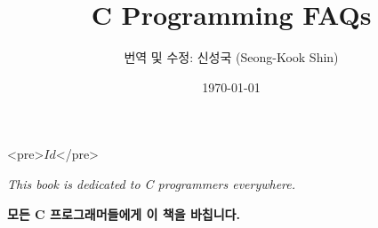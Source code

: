 \documentclass[10pt,a4paper,draft]{report}
\title{C Programming FAQs}
\author{번역 및 수정: 신성국 (Seong-Kook Shin)}
\date{\today}
\newcommand{\BF}[1]{\textbf{#1}}
\newcommand{\EM}[1]{\textit{#1}}
\begin{document}

\begin{rawhtml}
<pre>$Id$</pre>
\end{rawhtml}

\pagestyle{headings}
\maketitle

\vspace{10em}
\begin{center}
\EM{This book is dedicated to C programmers everywhere.}

\vspace{2cm}

\BF{모든 C 프로그래머들에게 이 책을 바칩니다.}
\end{center}

\newpage
\tableofcontents



\newpage


\newpage


\newpage


\newpage


\newpage


\newpage


\newpage


\newpage


\newpage


\newpage


\newpage


\newpage


\newpage


\newpage


\newpage


\newpage


\newpage


\newpage


\newpage


\newpage


\newpage


\newpage 

\newpage 
        
\newpage

\end{document}
